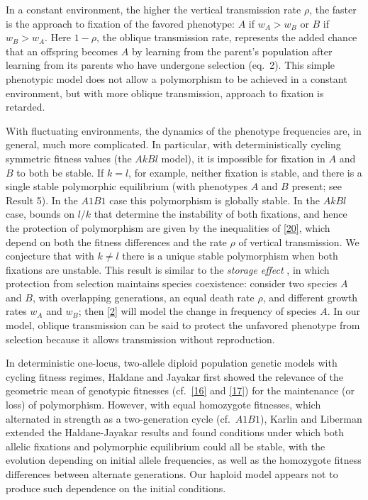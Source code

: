 \documentclass[9pt,twocolumn,twoside,lineno]{pnas-new}
\begin{document}
In a constant environment, the higher the vertical transmission rate $\rho$, the faster is the approach to fixation of the favored phenotype: $A$ if $w_A>w_B$ or $B$ if $w_B>w_A$. Here $1-\rho$, the oblique transmission rate, represents the added chance that an offspring becomes $A$ by learning from the parent's population after learning from its parents who have undergone selection (eq.\ 2). This simple phenotypic model does not allow a polymorphism to be achieved in a constant environment, but with more oblique transmission, approach to fixation is retarded.

 With fluctuating environments, the dynamics of the phenotype frequencies are, in general, much more complicated. In particular, with deterministically cycling symmetric fitness values (the $AkBl$ model), it is impossible for fixation in $A$ and $B$ to both be stable. If $k=l$, for example, neither fixation is stable, and there is a single stable polymorphic equilibrium (with phenotypes $A$ and $B$ present; see Result 5). In the $A1B1$ case this  polymorphism is globally stable. In the $AkBl$ case, bounds on $l/k$ that determine the instability of both fixations, and hence the protection of polymorphism are given by the inequalities of \eqref{20}, which depend on both the fitness differences and the rate $\rho$ of vertical transmission. We conjecture that with $k\ne l$ there is a unique stable polymorphism when both fixations are unstable.
This result is similar to the \emph{storage effect} \cite{chesson1981}, in which protection from selection maintains species coexistence: consider two species $A$ and $B$, with overlapping generations, an equal death rate $\rho$, and different growth rates $w_A$ and $w_B$; then \eqref{2} will model the change in frequency of species $A$. In our model, oblique transmission can be said to protect the unfavored phenotype from selection because it allows transmission without reproduction.
 
 In deterministic one-locus, two-allele diploid population genetic models with cycling fitness regimes, Haldane and Jayakar \cite{haldane1963polymorphism} first showed the relevance of the geometric mean of genotypic fitnesses (cf.\ \eqref{16} and \eqref{17}) for the maintenance (or loss) of polymorphism. However, with equal homozygote fitnesses, which alternated in strength as a two-generation cycle (cf.\ $A1B1$), Karlin and Liberman \cite{karlin1975random} extended the Haldane-Jayakar results and found conditions under which both allelic fixations and polymorphic equilibrium could all be stable, with the evolution depending on initial allele frequencies, as well as the homozygote fitness differences between alternate generations. Our haploid model appears not to produce such dependence on the initial conditions.
 
\end{document}

